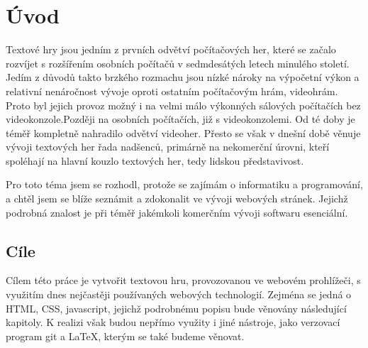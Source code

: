 \documentclass[main.tex]{subfiles}
\begin{document}
\section{Úvod}
Textové hry jsou jedním z prvních odvětví počítačových her, které se začalo rozvíjet s rozšířením osobních počítačů v sedmdesátých letech minulého století. Jedím z důvodů takto brzkého rozmachu jsou nízké nároky na výpočetní výkon a relativní nenáročnost vývoje oproti ostatním počítačovým hrám, videohrám. Proto byl jejich provoz možný i na velmi málo výkonných sálových počítačích bez videokonzole.Později na osobních počítačích, již s videokonzolemi. \cite{web:pcmag:en:oldcomputergames}
 Od té doby je téměř kompletně nahradilo odvětví videoher. Přesto se však v dnešní době věnuje vývoji textových her řada nadšenců, primárně na nekomerční úrovni, kteří spoléhají na hlavní kouzlo textových her, tedy lidskou představivost. \cite{web:wik:en:textgame}

Pro toto téma jsem se rozhodl, protože se zajímám o informatiku a programování, a chtěl jsem se blíže seznámit a zdokonalit ve vývoji webových stránek. Jejichž podrobná znalost je při téměř jakémkoli komerčním vývoji softwaru esenciální.

\subsection{Cíle}
Cílem této práce je vytvořit textovou hru, provozovanou ve webovém prohlížeči, s využitím dnes nejčastěji používaných webových technologií. Zejména se jedná o HTML, CSS, javascript, jejichž podrobnému popisu bude věnovány následující kapitoly. K realizi však budou nepřímo využity i jiné nástroje, jako verzovací program git a \LaTeX, kterým se také budeme věnovat.
\end{document}
